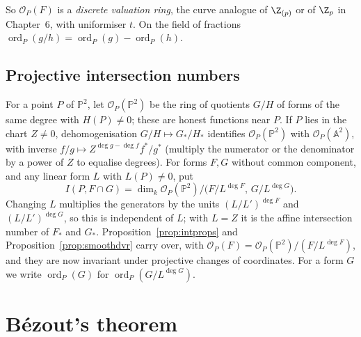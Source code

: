 So $\mathcal O_P(F)$ is a \emph{discrete valuation ring}, the curve analogue of $\Z_{(p)}$ or of $\Z_p$ in Chapter~6, with uniformiser $t$.
On the field of fractions $\operatorname{ord}_P(g/h)=\operatorname{ord}_P(g)-\operatorname{ord}_P(h)$.

\subsection*{Projective intersection numbers}

For a point $P$ of $\mathbb P^2$, let $\mathcal O_P(\mathbb P^2)$ be the ring of quotients $G/H$ of forms of the same degree with $H(P)\ne0$; these are
honest functions near $P$. If $P$ lies in the chart $Z\ne0$, dehomogenisation $G/H\mapsto G_*/H_*$ identifies $\mathcal O_P(\mathbb P^2)$ with
$\mathcal O_P(\mathbb A^2)$, with inverse $f/g\mapsto Z^{\deg g-\deg f}f^*/g^*$ (multiply the numerator or the denominator by a power of $Z$ to equalise
degrees). For forms $F,G$ without common component, and any linear form $L$ with $L(P)\ne0$, put
\[
I(P,F\cap G)=\dim_k\mathcal O_P(\mathbb P^2)\big/\bigl(F/L^{\deg F},\,G/L^{\deg G}\bigr).
\]
Changing $L$ multiplies the generators by the units $(L/L')^{\deg F}$ and $(L/L')^{\deg G}$, so this is independent of $L$; with $L=Z$ it is the
affine intersection number of $F_*$ and $G_*$. Proposition~\ref{prop:intprops} and Proposition~\ref{prop:smoothdvr} carry over, with $\mathcal O_P(F)=\mathcal O_P(\mathbb P^2)/(F/L^{\deg F})$, and they are now invariant under projective changes of coordinates. For a
form $G$ we write $\operatorname{ord}_P(G)$ for $\operatorname{ord}_P(G/L^{\deg G})$.

\section{B\'ezout's theorem}

